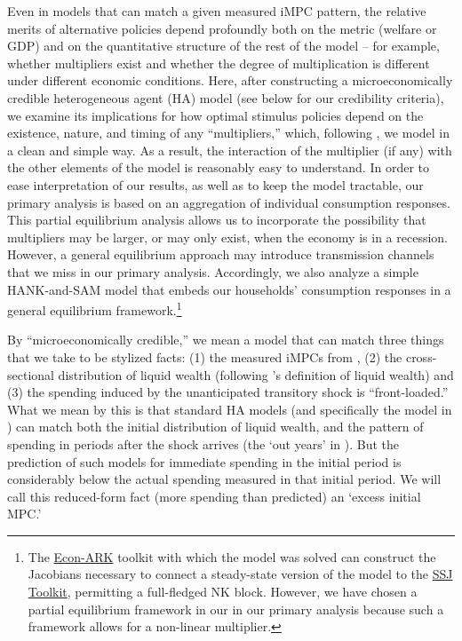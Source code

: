 \documentclass[\econtexRoot/HAFiscal]{subfiles}
\begin{document}
Even in models that can match a given measured iMPC pattern, the relative merits of alternative policies depend profoundly both on the metric (welfare or GDP) and on the quantitative structure of the rest of the model -- for example, whether multipliers exist and whether the degree of multiplication is different under different economic conditions. Here, after constructing a microeconomically credible heterogeneous agent (HA) model (see below for our credibility criteria), we examine its implications for how optimal stimulus policies depend on the existence, nature, and timing of any ``multipliers,'' which, following \cite{kmpHandbook2016}, we model in a clean and simple way.  As a result, the interaction of the multiplier (if any) with the other elements of the model is reasonably easy to understand. In order to ease interpretation of our results, as well as to keep the model tractable, our primary analysis is based on an aggregation of individual consumption responses. This partial equilibrium analysis allows us to incorporate the possibility that multipliers may be larger, or may only exist, when the economy is in a recession. However, a general equilibrium approach may introduce transmission channels that we miss in our primary analysis. Accordingly, we also analyze a simple HANK-and-SAM model that embeds our households' consumption responses in a general equilibrium framework.\footnote{The \href{https://econ-ark.org}{Econ-ARK} toolkit with which the model was solved can construct the Jacobians necessary to connect a steady-state version of the model to the \href{https://github.com/shade-econ/sequence-jacobian}{SSJ Toolkit}, permitting a full-fledged NK block. However, we have chosen a partial equilibrium framework in our in our primary analysis because such a framework allows for a non-linear multiplier. }

\hypertarget{microeconomically-credible}{}
By ``microeconomically credible,'' we mean a model that can match three things that we take to be stylized facts: (1) the measured iMPCs from \cite{fagereng_mpc_2021}, (2) the cross-sectional distribution of liquid wealth (following \cite{kaplan2014model}'s definition of liquid wealth) and (3) the spending induced by the unanticipated transitory shock is ``front-loaded.''
What we mean by this is that standard HA models (and specifically the model in \cite{cstwMPC}) can match both the initial distribution of liquid wealth, and the pattern of spending in periods after the shock arrives (the `out years' in \cite{fagereng_mpc_2021}).  But the prediction of such models for immediate spending in the initial period is considerably below the actual spending measured in that initial period.  We will call this reduced-form fact (more spending than predicted) an `excess initial MPC.'
\end{document}
